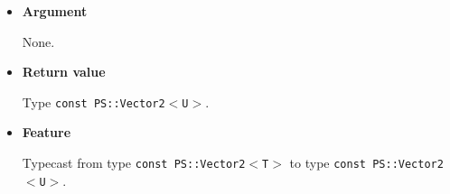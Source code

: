 \begin{itemize}

\item{{\bf Argument}}

  None.

\item{{\bf Return value}}

  Type \texttt{const PS::Vector2$<$U$>$}.

\item{{\bf Feature}}

  Typecast from type \texttt{const PS::Vector2$<$T$>$} to type \texttt{const
  PS::Vector2$<$U$>$}.

\end{itemize}



